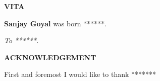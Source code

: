 \newpage
\begin{center}
 {\large\bf VITA}\vspace{0.3in} \\
 
 
\end{center}

\doublespacing

\vspace{-1mm}
\textbf{Sanjay Goyal} was born ******. 

\newpage
 
 
 \vspace*{2in}

 
{\large \sl
\hspace{1in} To ******.   
}


\newpage
\begin{center}
{\large\bf ACKNOWLEDGEMENT}\vspace{0.3in}
\end{center}
First and foremost I would like to thank *******